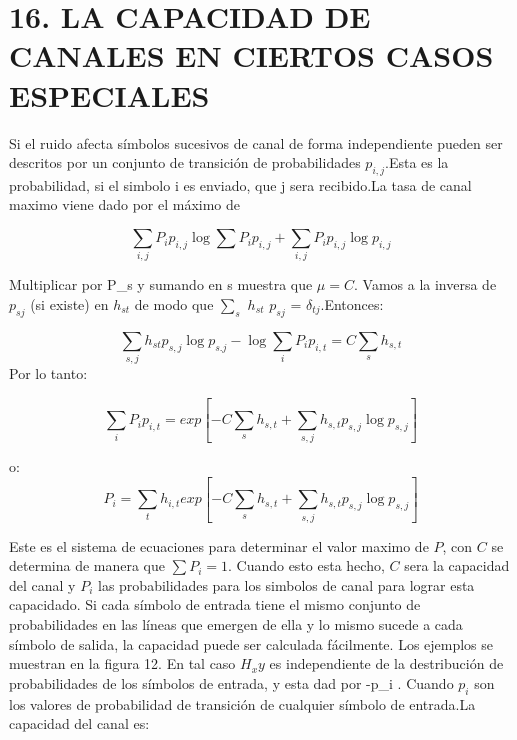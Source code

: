 \section{16. LA CAPACIDAD DE CANALES EN CIERTOS CASOS ESPECIALES}


Si el ruido afecta símbolos sucesivos de canal de forma independiente pueden ser descritos por un conjunto de transici\'on 
de probabilidades $p_{i,j}$.Esta es la probabilidad, si el simbolo i es enviado, que j sera recibido.La tasa de canal maximo 
viene dado por el m\'aximo de

\begin{equation}
	\sum_{i,j}P_i p_{i,j} \log{\sum{P_i p_{i,j}}} + \sum_{i,j}P_i p_{i,j}\log{p_{i,j}}
\end{equation}
 
Multiplicar por P_s y sumando en s muestra que $\mu = C$. Vamos a la inversa de $p_{sj}$ (si existe) en $h_{st}$  de modo que 
$\sum_{s}$ $h_{st}$ $p_{sj}$ = $\delta_{tj}$.Entonces: 

\begin{equation}
	\sum_{s,j}h_{st} p_{s,j} \log{p_{s.j}} - \log{\sum_{i}P_i p_{i,t}} = C \sum_{s} h_{s,t}
\end{equation}
Por lo tanto:

\begin{equation}
	\sum_{i} P_i p_{i,t} = exp[- C \sum_{s} h_{s,t}+ \sum_{s,j} h_{s,t} p_{s,j} \log{p_{s,j}}]
\end{equation}

o:  
\begin{equation}
	P_i = \sum_{t} h_{i,t} exp[ - C \sum_{s} h_{s,t}+ \sum_{s,j} h_{s,t} p_{s,j} \log{p_{s,j}} ]
\end{equation}


Este es el sistema de ecuaciones para determinar el valor maximo de $P$, con $C$ se determina 
de manera que $\sum P_i = 1$. Cuando esto esta hecho, $C$ sera la capacidad del canal y $P_i$ las probabilidades 
para los simbolos de canal para lograr esta capacidado.
Si cada s\'imbolo de entrada tiene el mismo conjunto de probabilidades en las l\'ineas que emergen de ella 
y lo mismo sucede a cada s\'imbolo de salida, la capacidad puede ser calculada f\'acilmente. Los ejemplos se muestran en la figura 12. 
En tal caso $H_xy$ es independiente de la destribuci\'on de probabilidades de los s\'imbolos de entrada, y esta dad por -\sum p_i . 
Cuando $p_i$ son los valores de probabilidad de transici\'on de cualquier s\'imbolo de entrada.La capacidad del canal es:

